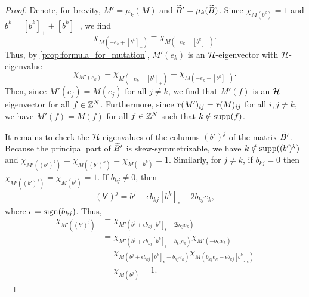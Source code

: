 \begin{proof}
	Denote, for brevity, $M' = \mu_k(M)$ and $\widetilde{B}' = \mu_k(\widetilde{B})$. Since $\chi_{M(b^k)} = 1$ and $b^k = [b^k]_{+} + [b^k]_{-}$, we find
	\begin{equation*}
		\chi_{M(-e_k + [b^k]_{+})} = \chi_{M(-e_k - [b^k]_{-})}.
	\end{equation*}
	Thus, by \cref{prop:formula_for_mutation}, $M'(e_k)$ is an $\mathcal{H}$-eigenvector with
	$\mathcal{H}$-eigenvalue
	\begin{equation*}
		\chi_{M'(e_k)} = \chi_{M(-e_k + [b^k]_{+})} = \chi_{M(-e_k - [b^k]_{-})}.
	\end{equation*}
	Then, since $M'(e_j) = M(e_j)$ for all $j \neq k$, we find that $M'(f)$ is an $\mathcal{H}$-eigenvector for all $f \in \mathbb{Z}^N$. Furthermore, since $\mathbf{r}(M')_{ij} = \mathbf{r}(M)_{ij}$ for all $i,j \neq k$, we have $M'(f) = M(f)$ for all $f \in \mathbb{Z}^N$ such that $k \notin \operatorname{supp}(f)$.

	It remains to check the $\mathcal{H}$-eigenvalues of the columns $(b')^j$ of the matrix
	$\widetilde{B}'$. Because the principal part of $\widetilde{B}'$ is skew-symmetrizable, we have $k \notin
		\operatorname{supp}((b')^k)$ and $\chi_{M'((b')^k)} = \chi_{M((b')^k)} = \chi_{M(-b^k)} = 1$.
	Similarly, for $j \neq k$, if $b_{kj} = 0$ then $\chi_{M'((b')^j)} = \chi_{M(b^j)} =
		1$. If $b_{kj} \neq 0$, then
	\begin{equation*}
		(b')^j = b^j + \epsilon b_{kj}[b^k]_{\epsilon} - 2 b_{kj}e_k,
	\end{equation*}
	where $\epsilon = \operatorname{sign}(b_{kj})$. Thus,
	\begin{align*}
		\chi_{M'((b')^j)}
		 & = \chi_{M'(b^j + \epsilon b_{kj}[b^k]_\epsilon - 2b_{kj} e_k)}                                                  \\
		 & = \chi_{M'(b^j + \epsilon b_{kj}[b^k]_\epsilon - b_{kj} e_k)}\chi_{M'(-b_{kj}e_k)}                              \\
		 & = \chi_{M(b^j + \epsilon b_{kj}[b^k]_\epsilon - b_{kj} e_k)}\chi_{M(b_{kj}e_k - \epsilon b_{kj}[b^k]_\epsilon)} \\
		 & = \chi_{M(b^j)} = 1.
	\end{align*}
\end{proof}

